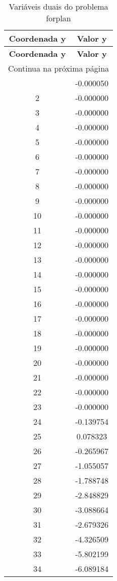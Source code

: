 \documentclass[12pt]{article}
\begin{document}
\begin{longtable}{@{}cc@{}}
\caption{Variáveis duais do problema forplan} \\
\toprule
\textbf{Coordenada y} & \textbf{Valor y} \\
\midrule
\endfirsthead

\toprule
\textbf{Coordenada y} & \textbf{Valor y} \\
\midrule
\endhead

\midrule \multicolumn{2}{r}{{Continua na próxima página}} \\ \midrule
\endfoot

\bottomrule
\endlastfoot
1 & -0.000050 \\
2 & -0.000000 \\
3 & -0.000000 \\
4 & -0.000000 \\
5 & -0.000000 \\
6 & -0.000000 \\
7 & -0.000000 \\
8 & -0.000000 \\
9 & -0.000000 \\
10 & -0.000000 \\
11 & -0.000000 \\
12 & -0.000000 \\
13 & -0.000000 \\
14 & -0.000000 \\
15 & -0.000000 \\
16 & -0.000000 \\
17 & -0.000000 \\
18 & -0.000000 \\
19 & -0.000000 \\
20 & -0.000000 \\
21 & -0.000000 \\
22 & -0.000000 \\
23 & -0.000000 \\
24 & -0.139754 \\
25 & 0.078323 \\
26 & -0.265967 \\
27 & -1.055057 \\
28 & -1.788748 \\
29 & -2.848829 \\
30 & -3.088664 \\
31 & -2.679326 \\
32 & -4.326509 \\
33 & -5.802199 \\
34 & -6.089184 \\

\end{longtable}
\end{document}
